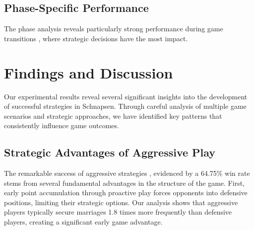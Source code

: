 \documentclass[runningheads]{llncs}
\begin{document}
\subsection{Phase-Specific Performance}
The phase analysis reveals particularly strong performance during game transitions \cite{ref_alpha_beta_cards}, where strategic decisions have the most impact.
\begin{table}[ht]
\caption{Strategy Performance by Game Phase}
\label{table:strategy-performance-game-phase}
\centering
{}
\end{table}




























\section{Findings and Discussion}

Our experimental results reveal several significant insights into the development of successful strategies in Schnapsen. Through careful analysis of multiple game scenarios and strategic approaches, we have identified key patterns that consistently influence game outcomes.

\subsection{Strategic Advantages of Aggressive Play}
The remarkable success of aggressive strategies \cite{ref_eval_functions}, evidenced by a 64.75\% win rate stems from several fundamental advantages in the structure of the game. First, early point accumulation through proactive play forces opponents into defensive positions, limiting their strategic options. Our analysis shows that aggressive players typically secure marriages 1.8 times more frequently than defensive players, creating a significant early game advantage.
\end{document}
